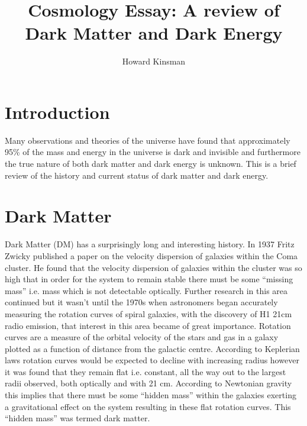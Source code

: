 \documentclass[a4paper,12pt]{article}
\author{Howard Kinsman}
\title{Cosmology Essay: A review of Dark Matter and Dark Energy}
\begin{document}
\maketitle
\section{Introduction}
Many observations and theories of the universe have found that approximately 95\% of the mass and energy in the universe is dark and invisible and furthermore the true nature of
both dark matter and dark energy is unknown. This is a brief review of the history and current status of dark matter and dark energy.
\section{Dark Matter}
Dark Matter (DM) has a surprisingly long and interesting history. In 1937 Fritz Zwicky published a paper on the velocity dispersion of galaxies within the Coma cluster. He found
that the velocity dispersion of galaxies within the cluster was so high that in order for the system to remain stable there must be some ``missing mass'' i.e. mass which
is not detectable optically. Further research in this area continued but it wasn't until the 1970s when astronomers began accurately measuring the rotation curves of spiral galaxies,
with the discovery of H1 21cm radio emission, that interest in this area became of great importance.
Rotation curves are a measure of the orbital velocity of the stars and gas in a galaxy plotted as a function of distance from the galactic centre. According to
Keplerian laws rotation curves would be expected to decline with increasing radius however it was found that they remain flat i.e. constant, all the way out to the largest radii observed, 
both optically and with 21 cm. According to Newtonian gravity this implies that there must be some ``hidden mass'' within the galaxies exerting a gravitational effect on the system resulting
in these flat rotation curves. This ``hidden mass'' was termed dark matter.
\end{document}
